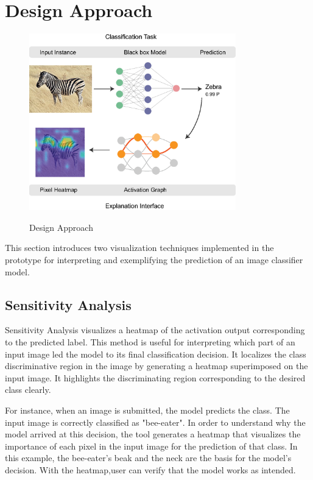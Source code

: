 \section{Design Approach}

\begin{figure}[htbp]
\centering\textbf{}
\includegraphics[width=0.80\textwidth]{images/method-schema-copy.eps}
\caption{Design Approach}
\label{fig:design-approach}
\end{figure}

This section introduces two visualization techniques implemented in the prototype for interpreting and exemplifying the prediction of an image classifier model.

\subsection{Sensitivity Analysis}

Sensitivity Analysis visualizes a heatmap of the activation output corresponding to the predicted label. This method is useful for interpreting which part of an input image led the model to its final classification decision. It localizes the class discriminative region in the image by generating a heatmap superimposed on the input image. It highlights the discriminating region corresponding to the desired class clearly.

For instance, when an image is submitted, the model predicts the class. The input image is correctly classified as "bee-eater". In order to understand why the model arrived at this decision, the tool generates a heatmap that visualizes the importance of each pixel in the input image for the prediction of that class. In this example, the bee-eater's beak and the neck are the basis for the model's decision. With the heatmap,user can verify that the model works as intended.

